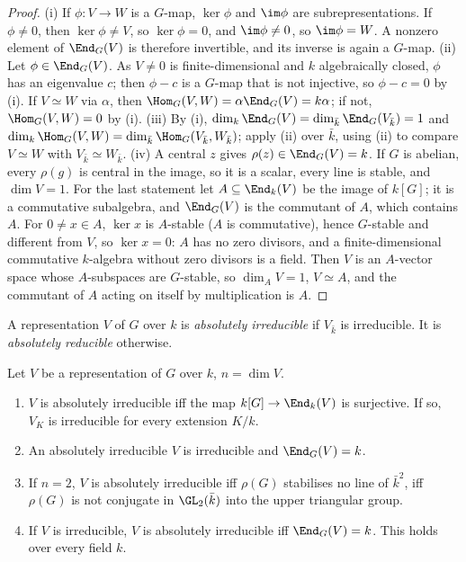 \begin{proof}
(i) If $\phi\colon V\to W$ is a $G$-map, $\ker\phi$ and $\im\phi$ are subrepresentations. If $\phi\ne0$, then $\ker\phi\ne V$, so $\ker\phi=0$, and
$\im\phi\ne0$, so $\im\phi=W$. A nonzero element of $\End_G(V)$ is therefore invertible, and its inverse is again a $G$-map.
(ii) Let $\phi\in\End_G(V)$. As $V\ne0$ is finite-dimensional and $k$ algebraically closed, $\phi$ has an eigenvalue $c$; then $\phi-c$ is a
$G$-map that is not injective, so $\phi-c=0$ by (i). If $V\simeq W$ via $\alpha$, then $\Hom_G(V,W)=\alpha\End_G(V)=k\alpha$; if not, $\Hom_G(V,W)=0$
by (i).
(iii) By (i), $\dim_k\End_G(V)=\dim_{\bar k}\End_G(V_{\bar k})=1$ and $\dim_k\Hom_G(V,W)=\dim_{\bar k}\Hom_G(V_{\bar k},W_{\bar k})$; apply (ii)
over $\bar k$, using (ii) to compare $V\simeq W$ with $V_{\bar k}\simeq W_{\bar k}$.
(iv) A central $z$ gives $\rho(z)\in\End_G(V)=k$. If $G$ is abelian, every $\rho(g)$ is central in the image, so it is a scalar, every
line is stable, and $\dim V=1$. For the last statement let $A\subseteq\End_k(V)$ be the image of $k[G]$; it is a commutative subalgebra, and
$\End_G(V)$ is the commutant of $A$, which contains $A$. For $0\ne x\in A$, $\ker x$ is $A$-stable ($A$ is commutative), hence $G$-stable
and different from $V$, so $\ker x=0$: $A$ has no zero divisors, and a finite-dimensional commutative $k$-algebra without zero
divisors is a field. Then $V$ is an $A$-vector space whose $A$-subspaces are $G$-stable, so $\dim_AV=1$, $V\simeq A$, and the commutant
of $A$ acting on itself by multiplication is $A$.
\end{proof}

\begin{definition}\label{def:reps:absirr}
A representation $V$ of $G$ over $k$ is \emph{absolutely irreducible} if $V_{\bar k}$ is irreducible. It is \emph{absolutely reducible}
otherwise.
\end{definition}

\begin{proposition}\label{prop:reps:absirr}
Let $V$ be a representation of $G$ over $k$, $n=\dim V$.
\begin{enumerate}[label=(\roman*)]
\item $V$ is absolutely irreducible iff the map $k[G]\to\End_k(V)$ is surjective. If so, $V_K$ is irreducible for every extension $K/k$.
\item An absolutely irreducible $V$ is irreducible and $\End_G(V)=k$.
\item If $n=2$, $V$ is absolutely irreducible iff $\rho(G)$ stabilises no line of $\bar k^2$, iff $\rho(G)$ is not conjugate in $\GL_2(\bar k)$ into
the upper triangular group.
\item If $V$ is irreducible, $V$ is absolutely irreducible iff $\End_G(V)=k$. This holds over every field $k$.
\end{enumerate}
\end{proposition}

